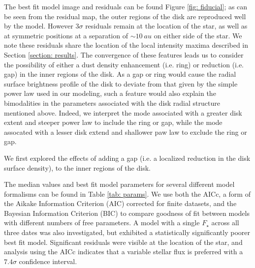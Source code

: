 \documentclass[12pt,oneside]{article}
\begin{document}
The best fit model image and residuals can be found Figure \ref{fig: fiducial}; as can be seen from the residual map, the outer regions of the disk are reproduced well by the model. 
However $3\sigma$ residuals remain at the location of the star, as well as at symmetric positions at a separation of $\sim \SI{10}{au}$ on either side of the star. 
We note these residuals share the location of the local intensity maxima described in Section \ref{section: results}. 
The convergence of these features leads us to consider the possibility of either a dust density enhancement (i.e. ring) or reduction (i.e. gap) in the inner regions of the disk. 
As a gap or ring would cause the radial surface brightness profile of the disk to deviate from that given by the simple power law used in our modeling, such a feature would also explain the bimodalities in the parameters associated with the disk radial structure mentioned above.
Indeed, we interpret the mode associated with a greater disk extent and steeper power law to include the ring or gap, while the mode assocated with a lesser disk extend and shallower paw law to exclude the ring or gap.

We first explored the effects of adding a gap (i.e. a localized reduction in the disk surface density), to the inner regions of the disk.

The median values and best fit model parameters for several different model formalisms can be found in Table \ref{tab: params}. 
We use both the AICc, a form of the Aikake Information Criterion (AIC) corrected for finite datasets, and the Bayesian Information Criterion (BIC) to compare goodness of fit between models with different numbers of free parameters.  
A model with a single $F_\star$ across all three dates was also investigated, but exhibited a statistically significantly poorer best fit model. 
Significant residuals were visible at the location of the star, and analysis using the AICc indicates that a variable stellar flux is preferred with a $7.4 \sigma$ confidence interval.
\end{document}
